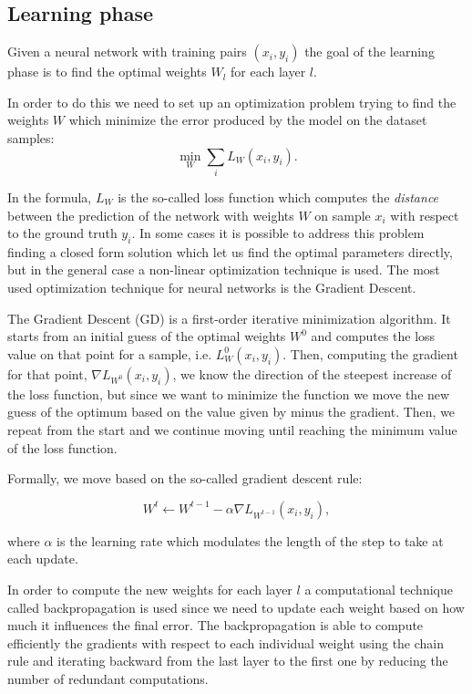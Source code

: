 \documentclass[binding=0.6cm,noexaminfo]{sapthesis}
\begin{document}
\subsection{Learning phase}

Given a neural network with training pairs $(x_i,y_i)$ the goal of the learning phase is to find the optimal weights $W_l$ for each layer $l$.

In order to do this we need to set up an optimization problem trying to find the weights $W$ which minimize the error produced by the model on the dataset samples:
\begin{equation}
\min_{W} \sum_i L_W(x_i, y_i).
\end{equation}

In the formula, $L_W$ is the so-called loss function which computes the \textit{distance} between the prediction of the network with weights $W$ on sample $x_i$ with respect to the ground truth $y_i$.
In some cases it is possible to address this problem finding a closed form solution which let us find the optimal parameters directly, but in the general case a non-linear optimization technique is used. The most used optimization technique for neural networks is the Gradient Descent.

The Gradient Descent (GD) is a first-order iterative minimization algorithm. It starts from an initial guess of the optimal weights $W^0$ and computes the loss value on that point for a sample, i.e. $L_W^0(x_i, y_i)$. Then, computing the gradient for that point, $\nabla L_{W^0}(x_i, y_i)$, we know the direction of the steepest increase of the loss function, but since we want to minimize the function we move the new guess of the optimum based on the value given by minus the gradient. Then, we repeat from the start and we continue moving until reaching the minimum value of the loss function.

Formally, we move based on the so-called gradient descent rule:

\begin{equation}
W^t \leftarrow W^{t-1} - \alpha \nabla L_{W^{t-1}}(x_i, y_i),
\end{equation}

where $\alpha$ is the learning rate which modulates the length of the step to take at each update.

In order to compute the new weights for each layer $l$ a computational technique called backpropagation is used since we need to update each weight based on how much it influences the final error. The backpropagation is able to compute efficiently the gradients with respect to each individual weight using the chain rule and iterating backward from the last layer to the first one by reducing the number of redundant computations.
\end{document}
